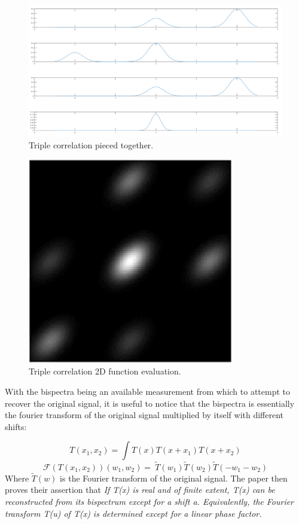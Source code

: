 \documentclass[a4paper]{article}
\begin{document}
\begin{figure}
\centering
\includegraphics[width=1.0\textwidth]{figures/triple_correlation.png}
\caption{\label{fig:triple_correlation_explanation}Triple correlation pieced together.}
\end{figure}

\begin{figure}
\centering
\includegraphics[width=0.8\textwidth]{figures/triple_correlation_img.png}
\caption{\label{fig:triple_correlation_img}Triple correlation 2D function evaluation.}
\end{figure}
With the bispectra being an available measurement from which to attempt to recover the original signal,  it is useful to notice that the bispectra is essentially the fourier transform of the original signal multiplied by itself with different shifts:

\[T\left(x_1,x_2\right)=  \int T\left(x\right)T\left(x+x_1\right)T(x+x_2)\]
\[\mathcal{F}\left(T\left(x_1,x_2\right)\right)\left(w_1,w_2\right)=\ \widetilde{T}(w_1)\widetilde{T}(w_2)\widetilde{T}(-w_1-w_2)\]
Where $\widetilde{T}(w)$ is the Fourier transform of the original signal. The paper then proves their assertion that \textit{If T(x) is real and of finite extent, T(x) can be reconstructed from its bispectrum except for a shift a. Equivalently, the Fourier transform T(u) of T(x) is determined except for a linear phase factor.}
\end{document}

